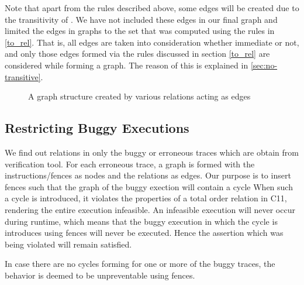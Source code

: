 Note that apart from the rules described above, some \setTO edges 
will be created due to the transitivity of \setTO.
We have not included these edges in our final graph and limited 
the edges in graphs to the set that was computed using the rules 
in \textsection\ref{to_rel}. That is, all \setSB edges are taken into 
consideration whether immediate 
or not, and only those edges formed via the \setTO rules discussed in 
section \textsection\ref{to_rel} are considered while forming a graph. 
The reason of this is explained in \textsection\ref{sec:no-transitive}.


\begin{figure}
\begin{center}
	
	\caption{A graph structure created by various relations acting as edges}
	\label{fig:cycles}
\end{center}
\end{figure}

\subsection{Restricting Buggy Executions}
\par
We find out \setTO relations in only the buggy or erroneous traces which 
are obtain from verification tool. For each erroneous trace, a graph is 
formed with the instructions/fences as nodes and the \setTO relations as 
edges. 
Our purpose is to insert fences such that the graph of the buggy exection 
will contain a cycle 
When such a cycle is introduced, it violates the properties of a total 
order relation in C11, rendering the entire execution infeasible. 
An infeasible execution will never occur during runtime, which means 
that the buggy execution in which the \setTO cycle is introduces using 
fences will never be executed. 
Hence the assertion which was being violated will remain satisfied. 

In case there are no cycles forming for one or more of the buggy traces, 
the behavior is deemed to be unpreventable using \mosc fences. 

